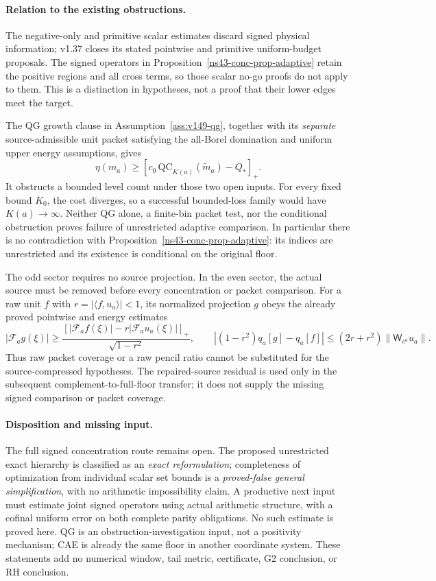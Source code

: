 \documentclass[11pt]{article}
\theoremstyle{remark}
\begin{document}
\paragraph{Relation to the existing obstructions.}
The negative-only and primitive scalar estimates discard signed
physical information; v1.37 closes its stated pointwise and primitive
uniform-budget proposals. The signed operators in
Proposition~\ref{ns43-conc-prop-adaptive} retain the positive regions
and all cross terms, so those scalar no-go proofs do not apply to them.
This is a distinction in hypotheses, not a proof that their lower
edges meet the target.

The QG growth clause in Assumption~\ref{ass:v149-qg}, together with
its \emph{separate} source-admissible unit packet satisfying the
all-Borel domination and uniform upper energy assumptions, gives
\[
 \eta(m_a)\ge
 [c_0\,\mathrm{QC}_{K(a)}(\widetilde m_a)-Q_*]_+.
\]
It obstructs a bounded level count under those two open inputs.
For every fixed bound $K_0$, the cost diverges, so a successful
bounded-loss family would have $K(a)\to\infty$.
Neither QG alone, a finite-bin packet test, nor the conditional
obstruction proves failure of unrestricted adaptive comparison.
In particular there is no contradiction with
Proposition~\ref{ns43-conc-prop-adaptive}: its indices are unrestricted
and its existence is conditional on the original floor.

The odd sector requires no source projection. In the even sector,
the actual source must be removed before every concentration or
packet comparison. For a raw unit $f$ with
$r=|\langle f,u_a\rangle|<1$, its normalized projection $g$ obeys
the already proved pointwise and energy estimates
\[
 |\mathcal F_ag(\xi)|\ge
 \frac{[|\mathcal F_af(\xi)|-r|\mathcal F_au_a(\xi)|]_+}
 {\sqrt{1-r^2}},\qquad
 |(1-r^2)q_a[g]-q_a[f]|
 \le(2r+r^2)\|\mathsf W_{e^a}u_a\|.
\]
Thus raw packet coverage or a raw pencil ratio cannot be substituted
for the source-compressed hypotheses. The repaired-source residual
is used only in the subsequent complement-to-full-floor transfer;
it does not supply the missing signed comparison or packet coverage.

\paragraph{Disposition and missing input.}
The full signed concentration route remains open. The proposed
unrestricted exact hierarchy is classified as an \emph{exact
reformulation}; completeness of optimization from individual scalar
set bounds is a \emph{proved-false general simplification}, with no
arithmetic impossibility claim. A productive next input must estimate
joint signed operators using actual arithmetic structure, with a
cofinal uniform error on both complete parity obligations. No such
estimate is proved here. QG is an obstruction-investigation input,
not a positivity mechanism; CAE is already the same floor in another
coordinate system. These statements add no numerical window, tail
metric, certificate, G2 conclusion, or RH conclusion.
\end{document}
